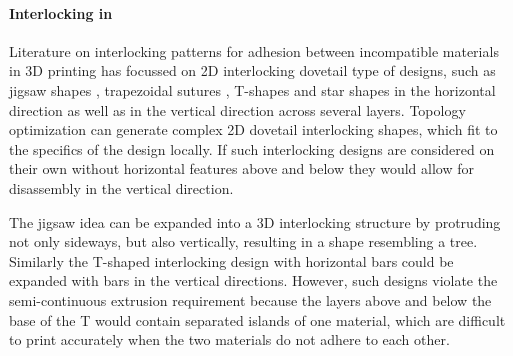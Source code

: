 

\paragraph{Interlocking in }

Literature on interlocking patterns for adhesion between incompatible materials in  3D printing has focussed on  2D interlocking dovetail type of designs,
such as jigsaw shapes \cite{malik2017}, trapezoidal sutures \cite{Li2013}, T-shapes\cite{Ribeiro2019,mustafa2021development} and star shapes\cite{Wang2021} in the horizontal direction
as well as in the vertical direction across several layers\cite{debora2020}.
Topology optimization can generate complex 2D dovetail interlocking shapes, which fit to the specifics of the design locally\cite{aharoni2021}.
{If such interlocking designs are considered on their own without horizontal features above and below they would allow for disassembly in the vertical direction.}

The jigsaw idea can be expanded into a 3D interlocking structure by protruding not only sideways, but also vertically, resulting in a shape resembling a tree\cite{gouker2006manufacturing}.
Similarly the T-shaped interlocking design with horizontal bars could be expanded with bars in the vertical directions.
However, such designs violate the semi-continuous extrusion requirement because the layers above and below the base of the T would contain separated islands of one material, 
which are difficult to print accurately when the two materials do not adhere to each other.

